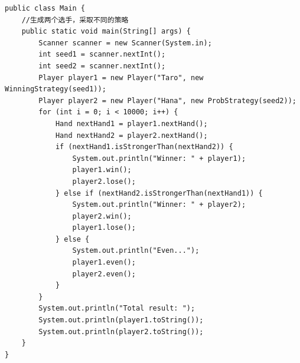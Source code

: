 \begin{lstlisting}
public class Main {
	//生成两个选手，采取不同的策略
	public static void main(String[] args) {
		Scanner scanner = new Scanner(System.in);
		int seed1 = scanner.nextInt();
		int seed2 = scanner.nextInt();
		Player player1 = new Player("Taro", new WinningStrategy(seed1));
		Player player2 = new Player("Hana", new ProbStrategy(seed2));
		for (int i = 0; i < 10000; i++) {
			Hand nextHand1 = player1.nextHand();
			Hand nextHand2 = player2.nextHand();
			if (nextHand1.isStrongerThan(nextHand2)) {
				System.out.println("Winner: " + player1);
				player1.win();
				player2.lose();
			} else if (nextHand2.isStrongerThan(nextHand1)) {
				System.out.println("Winner: " + player2);
				player2.win();
				player1.lose();
			} else {
				System.out.println("Even...");
				player1.even();
				player2.even();
			}
		}
		System.out.println("Total result: ");
		System.out.println(player1.toString());
		System.out.println(player2.toString());
	}
}
\end{lstlisting}
